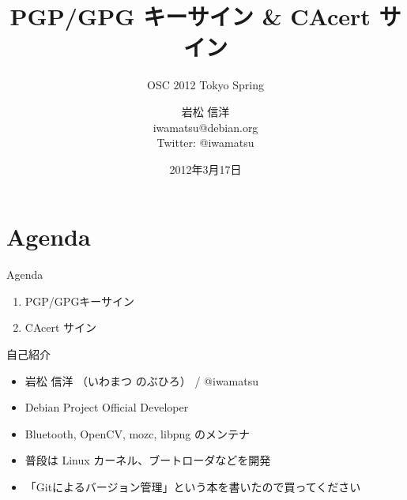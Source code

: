 

\title{PGP/GPG キーサイン \& CAcert サイン}
\subtitle{OSC 2012 Tokyo Spring}
\author{岩松 信洋\\iwamatsu@debian.org\\Twitter: @iwamatsu}
\date{2012年3月17日}



\frame{\titlepage{}}

\section{Agenda}

\begin{frame}{Agenda}
\begin{enumerate}
\item PGP/GPGキーサイン
\item CAcert サイン
\end{enumerate}
\end{frame}


\begin{frame}{自己紹介}
\begin{itemize}
\item 岩松 信洋 （いわまつ のぶひろ） / @iwamatsu
\item Debian Project Official Developer
\item Bluetooth, OpenCV, mozc, libpng のメンテナ
\item 普段は Linux カーネル、ブートローダなどを開発
\item 「Gitによるバージョン管理」という本を書いたので買ってください
\end{itemize}
\end{frame}

